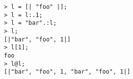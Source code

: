 \begin{center}\begin{minipage}{15cm}\begin{Verbatim}[frame=single]
> l = [| "foo" |];
> l = l:.1;
> l = "bar".:l;
> l;
[|"bar", "foo", 1|]
> l[1];
foo
> l@l;
[|"bar", "foo", 1, "bar", "foo", 1|]
\end{Verbatim}
\end{minipage}\end{center}
